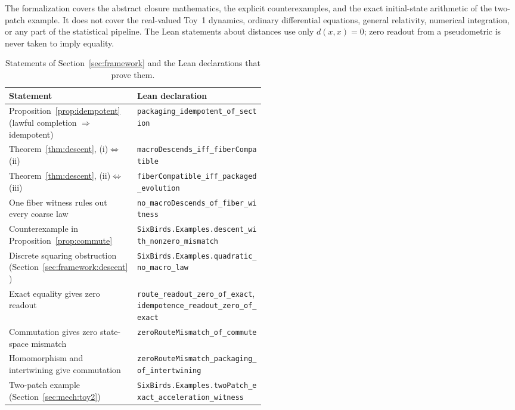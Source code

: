\documentclass[11pt]{article}
\theoremstyle{plain}
\theoremstyle{definition}
\theoremstyle{remark}
\begin{document}
The formalization covers the abstract closure mathematics, the explicit counterexamples, and the exact initial-state arithmetic of the two-patch example. It does not cover the real-valued Toy~1 dynamics, ordinary differential equations, general relativity, numerical integration, or any part of the statistical pipeline. The Lean statements about distances use only $d(x,x)=0$; zero readout from a pseudometric is never taken to imply equality.

\begin{table}[t]
\centering
\small
\caption{Statements of Section~\ref{sec:framework} and the Lean declarations that prove them.}
\label{tab:lean}
\begin{tabularx}{\linewidth}{@{}>{\raggedright\arraybackslash}X >{\raggedright\arraybackslash}p{0.5\linewidth}@{}}
\toprule
Statement & Lean declaration \\
\midrule
Proposition~\ref{prop:idempotent} (lawful completion $\Rightarrow$ idempotent) & \texttt{packaging\_idempotent\_of\_section} \\
Theorem~\ref{thm:descent}, (i)$\Leftrightarrow$(ii) & \texttt{macroDescends\_iff\_fiberCompatible} \\
Theorem~\ref{thm:descent}, (ii)$\Leftrightarrow$(iii) & \texttt{fiberCompatible\_iff\_packaged\_evolution} \\
One fiber witness rules out every coarse law & \texttt{no\_macroDescends\_of\_fiber\_witness} \\
Counterexample in Proposition~\ref{prop:commute} & \texttt{SixBirds.Examples.\allowbreak descent\_with\_nonzero\_mismatch} \\
Discrete squaring obstruction (Section~\ref{sec:framework:descent}) & \texttt{SixBirds.Examples.\allowbreak quadratic\_no\_macro\_law} \\
Exact equality gives zero readout & \texttt{route\_readout\_zero\_of\_exact}, \texttt{idempotence\_readout\_zero\_of\_exact} \\
Commutation gives zero state-space mismatch & \texttt{zeroRouteMismatch\_of\_commute} \\
Homomorphism and intertwining give commutation & \texttt{zeroRouteMismatch\_packaging\_\allowbreak of\_intertwining} \\
Two-patch example (Section~\ref{sec:mech:toy2}) & \texttt{SixBirds.Examples.\allowbreak twoPatch\_exact\_acceleration\_witness} \\
\bottomrule
\end{tabularx}
\end{table}
\end{document}
